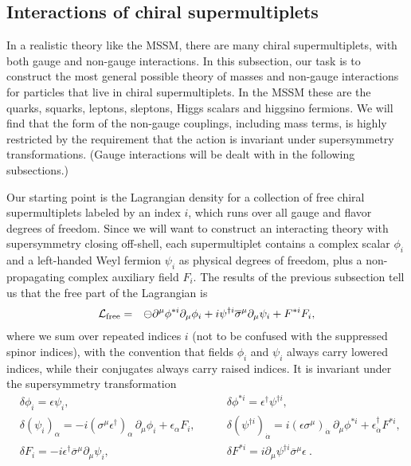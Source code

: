 \documentclass[11pt]{article}
\renewcommand{\theequation}{\arabic{section}.\arabic{equation}}
\def\BDpos{}
\def\BDpos{-}
\def\BDpos{\oplus}
\def\BDpos{\ominus}
\def\beq{\begin{eqnarray}}
\def\eeq{\end{eqnarray}}
\def\lagr{{\cal L}}
\def\deltaeps{\delta}
\def\sigmabar{\overline\sigma}
\begin{document}
\subsection{Interactions of chiral supermultiplets}\label{subsec:susylagr.chiral}
\setcounter{footnote}{1}
\renewcommand{\theequation}{\arabic{section}.\arabic{subsection}.\arabic{equation}}
\setcounter{equation}{0}

In a realistic theory like the MSSM, there are many chiral
supermultiplets, with both gauge and non-gauge interactions. In this
subsection, our task is to construct the most general possible theory of
masses and non-gauge interactions for particles that live in chiral
supermultiplets. In the MSSM these are the quarks, squarks, leptons,
sleptons, Higgs scalars and higgsino fermions. We will find that the form
of the non-gauge couplings, including mass terms, is highly restricted by
the requirement that the action is invariant under supersymmetry
transformations. (Gauge interactions will be dealt with in the following
subsections.)

Our starting point is the Lagrangian density for a collection of free
chiral supermultiplets labeled by an index $i$, which runs over all gauge
and flavor degrees of freedom. Since we will want to construct an
interacting theory with supersymmetry closing off-shell, each
supermultiplet contains a complex scalar $\phi_i$ and a left-handed Weyl
fermion $\psi_i$ as physical degrees of freedom, plus a non-propagating 
complex auxiliary
field $F_i$. The results of the previous
subsection tell us that the free part of the Lagrangian is
\beq
\lagr_{\rm free} &=&
\BDpos \partial^\mu \phi^{*i} \partial_\mu \phi_i
+ i {\psi}^{\dagger i} \sigmabar^\mu \partial_\mu \psi_i
+ F^{*i} F_i ,
\label{lagrfree}
\eeq
where we sum over repeated indices $i$ (not to be confused with the
suppressed spinor indices), with the convention that fields $\phi_i$ and
$\psi_i$ always carry lowered indices, while their conjugates always carry
raised indices. It is invariant under the supersymmetry transformation
\beq
&
\delta \phi_i = \epsilon\psi_i ,
\qquad\>\>\>\>\>\qquad\qquad\qquad
\phantom{xxxi}
&
\delta \phi^{*i} = \epsilon^\dagger {\psi}^{\dagger i} ,
\label{phitran}
\\
&
\delta (\psi_i)_\alpha = 
- i (\sigma^\mu {\epsilon^\dagger})_{\alpha}\, \partial_\mu
\phi_i + \epsilon_\alpha F_i ,
\qquad
&
\delta ({\psi}^{\dagger i})_{\dot{\alpha}}=
 i (\epsilon\sigma^\mu)_{\dot{\alpha}}\, \partial_\mu
\phi^{*i} + \epsilon^\dagger_{\dot{\alpha}} F^{*i} ,
\phantom{xxxx}
\\
&
\delta F_i = - i \epsilon^\dagger \sigmabar^\mu\partial_\mu \psi_i ,
\qquad\qquad\qquad
\phantom{xxi}
&
\deltaeps F^{* i} = 
 i\partial_\mu {\psi}^{\dagger i} \sigmabar^\mu  \epsilon\> .
\phantom{xxx}
\label{eq:Ftran}
\eeq
\end{document}
